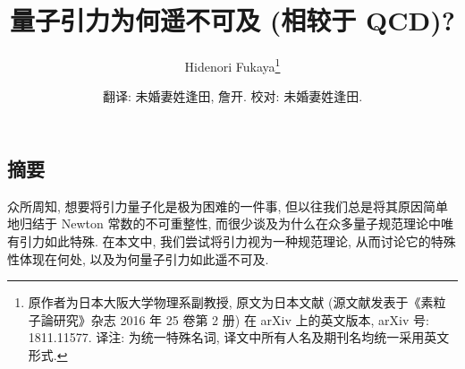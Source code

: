 \documentclass{article}
\title{\textbf{量子引力为何遥不可及 (相较于 QCD)?}}
\author{Hidenori Fukaya\footnote{原作者为日本大阪大学物理系副教授, 原文为日本文献 (源文献发表于《素粒子論研究》杂志 2016 年 25 卷第 2 册) 在 arXiv 上的英文版本, arXiv 号: 1811.11577. 译注: 为统一特殊名词, 译文中所有人名及期刊名均统一采用英文形式.}}
\date{翻译: 未婚妻姓逢田, 詹开. 校对: 未婚妻姓逢田.}
\begin{document}
\CJKspace
\newpage
{}
\newpage
{}
\maketitle


\begin{center}
\section*{摘要}
\end{center}
众所周知, 想要将引力量子化是极为困难的一件事, 但以往我们总是将其原因简单地归结于 Newton 常数的不可重整性, 而很少谈及为什么在众多量子规范理论中唯有引力如此特殊. 在本文中, 我们尝试将引力视为一种规范理论, 从而讨论它的特殊性体现在何处, 以及为何量子引力如此遥不可及.
\end{document}
